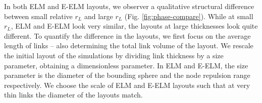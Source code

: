 \documentclass[nofootinbib,preprint,floatfix,endfloats]{revtex4} %
\begin{document}
In both ELM and E-ELM layouts, we observer a qualitative structural difference between small relative $r_L$ and large $r_L$ (Fig. \ref{fig:phase-compare}). While at small $r_L$, ELM and E-ELM look very similar, the layouts at large thicknesses look quite different. 
%
To quantify the difference in %
the layouts, we first focus on the 
%
%
average length of links -- also determining the total link volume of the layout.
We rescale the initial layout of the simulations %
by dividing link thickness by a size parameter, obtaining a dimensionless parameter. 
In ELM and E-ELM, the size parameter is the diameter of the bounding sphere and the node repulsion range respectively. We choose the scale of ELM and E-ELM layouts such that at very thin links the diameter of the layouts match. 
\end{document}
